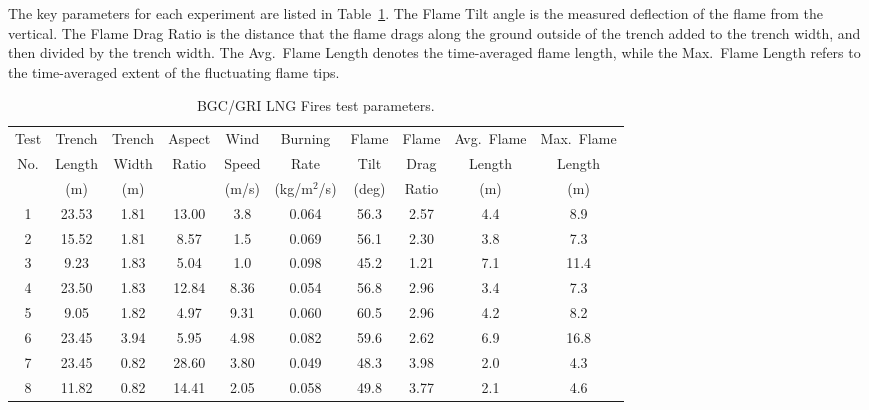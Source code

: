 The key parameters for each experiment are listed in Table~\ref{BGC_sum}. The Flame Tilt angle is the measured deflection of the flame from the vertical. The Flame Drag Ratio is the distance that the flame drags along the ground outside of the trench added to the trench width, and then divided by the trench width. The Avg.~Flame Length denotes the time-averaged flame length, while the Max.~Flame Length refers to the time-averaged extent of the fluctuating flame tips.

\begin{table}[!ht]
\centering
\caption[BGC/GRI LNG Fires test parameters]{BGC/GRI LNG Fires test parameters.}
\label{BGC_sum}
\begin{tabular}{|c|c|c|c|c|c|c|c|c|c|}
\hline
Test  & Trench     & Trench    & Aspect  & Wind        & Burning           & Flame       & Flame       & Avg.~Flame  & Max.~Flame  \\
No.   & Length     & Width     & Ratio   & Speed       & Rate              & Tilt        & Drag        & Length      & Length      \\
      &        (m) &       (m) &         & (m/s)       & (kg/m$^2$/s)      & (deg)       & Ratio       &        (m)  &        (m)  \\ \hline
1     & 23.53      & 1.81      & 13.00   & 3.8         & 0.064             & 56.3        & 2.57        & 4.4         & 8.9         \\ \hline
2     & 15.52      & 1.81      & 8.57    & 1.5         & 0.069             & 56.1        & 2.30        & 3.8         & 7.3         \\ \hline
3     & 9.23       & 1.83      & 5.04    & 1.0         & 0.098             & 45.2        & 1.21        & 7.1         & 11.4        \\ \hline
4     & 23.50      & 1.83      & 12.84   & 8.36        & 0.054             & 56.8        & 2.96        & 3.4         & 7.3         \\ \hline
5     & 9.05       & 1.82      & 4.97    & 9.31        & 0.060             & 60.5        & 2.96        & 4.2         & 8.2         \\ \hline
6     & 23.45      & 3.94      & 5.95    & 4.98        & 0.082             & 59.6        & 2.62        & 6.9         & 16.8        \\ \hline
7     & 23.45      & 0.82      & 28.60   & 3.80        & 0.049             & 48.3        & 3.98        & 2.0         & 4.3         \\ \hline
8     & 11.82      & 0.82      & 14.41   & 2.05        & 0.058             & 49.8        & 3.77        & 2.1         & 4.6         \\ \hline

\end{tabular}
\end{table}
